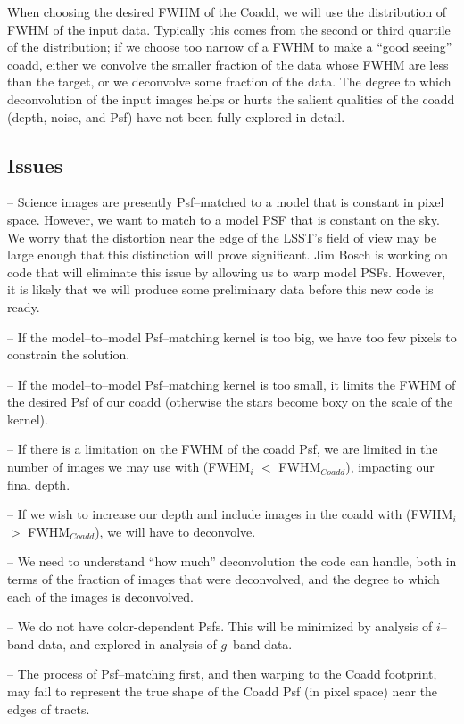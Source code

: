 \documentclass[12pt]{article}
\begin{document}
When choosing the desired FWHM of the Coadd, we will use the
distribution of FWHM of the input data.  Typically this comes from the
second or third quartile of the distribution; if we choose too narrow
of a FWHM to make a ``good seeing'' coadd, either we convolve the
smaller fraction of the data whose FWHM are less than the target, or
we deconvolve some fraction of the data.  The degree to which
deconvolution of the input images helps or hurts the salient qualities
of the coadd (depth, noise, and Psf) have not been fully explored in
detail.

\subsection{Issues}

-- Science images are presently Psf--matched to a model that is constant in pixel space.
However, we want to match to a model PSF that is constant on the sky. We worry that the
distortion near the edge of the LSST's field of view may be large enough
that this distinction will prove significant. Jim Bosch is working on code
that will eliminate this issue by allowing us to warp model PSFs.
However, it is likely that we will produce some preliminary data before this new code is ready.

-- If the model--to--model Psf--matching kernel is too big, we have
too few pixels to constrain the solution.

-- If the model--to--model Psf--matching kernel is too small, it
limits the FWHM of the desired Psf of our coadd (otherwise the stars
become boxy on the scale of the kernel).

-- If there is a limitation on the FWHM of the coadd Psf, we are
limited in the number of images we may use with (FWHM$_i$ $<$
FWHM$_{Coadd}$), impacting our final depth.

-- If we wish to increase our depth and include images in the coadd
with (FWHM$_i$ $>$ FWHM$_{Coadd}$), we will have to deconvolve.

-- We need to understand ``how much'' deconvolution the code can handle,
both in terms of the fraction of images that were deconvolved, and the
degree to which each of the images is deconvolved.

-- We do not have color-dependent Psfs.  This will be minimized by
analysis of $i$--band data, and explored in analysis of $g$--band
data.

-- The process of Psf--matching first, and then warping to the Coadd
footprint, may fail to represent the true shape of the Coadd Psf (in
pixel space) near the edges of tracts.
\end{document}
